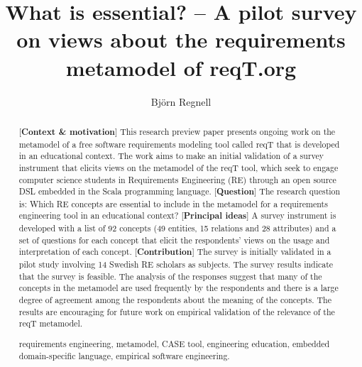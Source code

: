 \documentclass[a4paper]{llncs}
\newcommand{\keywords}[1]{\par\addvspace\baselineskip
\noindent\keywordname\enspace\ignorespaces#1}
\begin{document}

\mainmatter  %

\title{What is essential? -- A pilot survey on views about the requirements metamodel of reqT.org}

\author{Bj\"orn Regnell}
%


\maketitle

\begin{abstract}
[{\bf Context \& motivation}] This research preview paper presents ongoing work on the metamodel of a free software requirements modeling tool called reqT that is developed in an educational context. The work aims to make an initial validation of a survey instrument that elicits views on the metamodel of the reqT tool, which seek to engage computer science students in Requirements Engineering (RE) through an open source DSL embedded in the Scala programming language. [{\bf Question}] The research question is: Which RE concepts are essential to include in the metamodel for a requirements engineering tool in an educational context?  [{\bf Principal ideas}] A survey instrument is developed with a list of 92 concepts (49 entities, 15 relations and 28 attributes) and a set of questions for each concept that elicit the respondents' views on the usage and interpretation of each concept.  [{\bf Contribution}] The survey is initially validated in a pilot study involving 14 Swedish RE scholars as subjects. The survey results indicate that the survey is feasible. The analysis of the responses suggest that many of the concepts in the metamodel are used frequently by the respondents and there is a large degree of agreement among the respondents about the meaning of the concepts. The results are encouraging for future work on empirical validation of the relevance of the reqT metamodel. 

\keywords{requirements engineering, metamodel, CASE tool, engineering education, embedded domain-specific language, empirical software engineering.}
\end{abstract}
\end{document}
